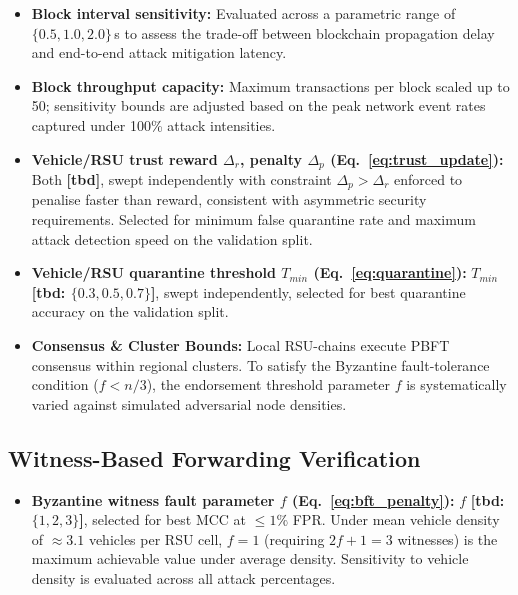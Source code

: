 \documentclass[12pt, a4paper]{report}
\begin{document}
{{\begin{itemize}
    \item \textbf{Block interval sensitivity:} Evaluated across a parametric range of $\{0.5, 1.0, 2.0\}$\,s to assess the trade-off between blockchain propagation delay and end-to-end attack mitigation latency.
    \item \textbf{Block throughput capacity:} Maximum transactions per block scaled up to 50; sensitivity bounds are adjusted based on the peak network event rates captured under 100\% attack intensities.
    
    \item \textbf{Vehicle/RSU trust reward $\Delta_r$,
    penalty $\Delta_p$
    (Eq.~\ref{eq:trust_update}):}
    Both \textbf{[tbd]}, swept independently with
    constraint $\Delta_p > \Delta_r$ enforced to
    penalise faster than reward, consistent with
    asymmetric security requirements. Selected for
    minimum false quarantine rate and maximum
    attack detection speed on the validation split.

    \item \textbf{Vehicle/RSU quarantine threshold
    $T_{min}$ (Eq.~\ref{eq:quarantine}):}
    $T_{min}$ \textbf{[tbd: $\{0.3, 0.5, 0.7\}$]},
    swept independently, selected for best
    quarantine accuracy on the validation split.



    
    \item \textbf{Consensus \& Cluster Bounds:} Local RSU-chains execute PBFT consensus within regional clusters. To satisfy the Byzantine fault-tolerance condition ($f < n/3$), the endorsement threshold parameter $f$ is systematically varied against simulated adversarial node densities.

\end{itemize}

\subsection{Witness-Based Forwarding Verification}
\begin{itemize}
    \item \textbf{Byzantine witness fault parameter
    $f$ (Eq.~\ref{eq:bft_penalty}):}
    $f$ \textbf{[tbd: $\{1, 2, 3\}$]}, selected
    for best MCC at $\leq 1\%$ FPR. Under mean
    vehicle density of $\approx 3.1$ vehicles per
    RSU cell, $f{=}1$ (requiring $2f{+}1{=}3$
    witnesses) is the maximum achievable value
    under average density. Sensitivity to vehicle
    density is evaluated across all attack
    percentages.


\end{itemize}}}
\end{document}
